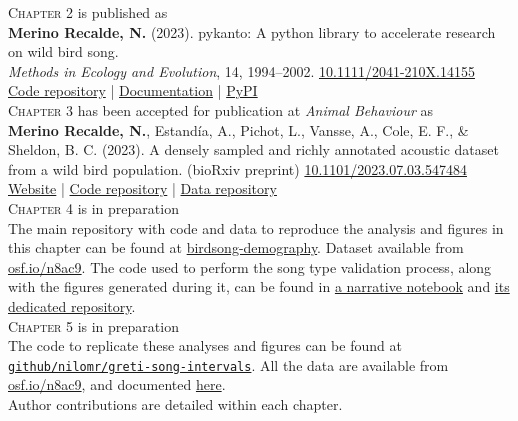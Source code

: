 
\vspace*{2cm}

\noindent \textsc{Chapter 2} is published as\\[.1cm]

\noindent \textbf{Merino Recalde, N.} (2023). pykanto: A python library to accelerate research on wild bird song.\\\textit{Methods in Ecology and Evolution}, 14, 1994--2002. \href{https://doi.org/10.1111/2041-210X.14155}{10.1111/2041-210X.14155}\\[.2cm]
\href{https://github.com/nilomr/pykanto}{Code repository} |  \href{https://nilomr.github.io/pykanto/_build/html/index.html}{Documentation} | \href{https://pypi.org/project/pykanto/}{PyPI}\\[.5cm]

\noindent \textsc{Chapter 3} has been accepted for publication at \textit{Animal Behaviour} as\\[.1cm]

\noindent \textbf{Merino Recalde, N.}, Estandía, A., Pichot, L., Vansse, A., Cole, E. F., \& Sheldon, B. C. (2023). A densely sampled and richly annotated acoustic dataset from a wild bird population. (bioRxiv preprint) \href{https://doi.org/10.1101/2023.07.03.547484}{10.1101/2023.07.03.547484}\\[.2cm]
\href{https://nilomr.github.io/great-tit-hits}{Website} | \href{https://github.com/nilomr/great-tit-hits-setup}{Code repository} | \href{https://osf.io/n8ac9/}{Data repository}\\[.5cm]


\noindent \textsc{Chapter 4} is in preparation \\[.1cm]

\noindent The main repository with code and data to reproduce the analysis and figures in this chapter can be found at \href{http://github.com/nilomr/birdsong-demography}{birdsong-demography}. Dataset available from \href{https://osf.io/n8ac9}{osf.io/n8ac9}. The code used to perform the song type validation process, along with the figures generated during it, can be found in \href{https://github.com/nilomr/wytham-songtype-validation/blob/main/notebooks/4_train-model.ipynb}{a narrative notebook} and \href{https://github.com/nilomr/wytham-songtype-validation}{its dedicated repository}.\\[.5cm]

\noindent \textsc{Chapter 5} is in preparation \\[.1cm]

\noindent The code to replicate these analyses and figures can be found at \href{https://github.com/nilomr/greti-song-intervals}{\nolinkurl{github/nilomr/greti-song-intervals}}. All the data are available from \href{https://osf.io/n8ac9}{osf.io/n8ac9}, and documented \href{https://nilomr.github.io/great-tit-hits/}{here}.\\[.7cm]

\noindent Author contributions are detailed within each chapter.\\[.5cm]